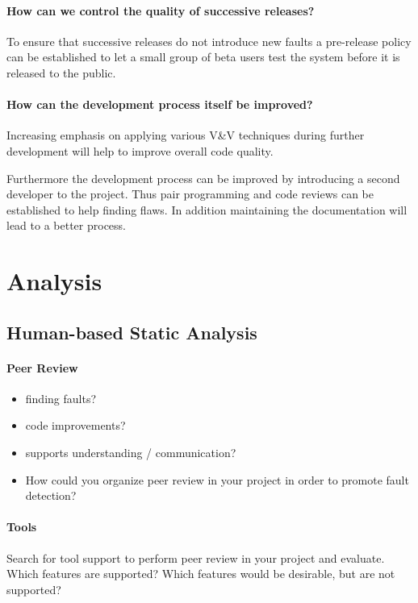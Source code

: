 \documentclass{scrartcl}
\begin{document}
\paragraph{How can we control the quality of successive releases?}

To ensure that successive releases do not introduce new faults a pre-release policy can be established to let a small group of beta users test the system before it is released to the public.

\paragraph{How can the development process itself be improved?}

Increasing emphasis on applying various V\&V techniques during further development will help to improve overall code quality. 

Furthermore the development process can be improved by introducing a second developer to the project. Thus pair programming and code reviews can be established to help finding flaws. In addition maintaining the documentation will lead to a better process.


\section{Analysis}

\subsection{Human-based Static Analysis}

\paragraph{Peer Review}
\begin{itemize}
	\item finding faults?
	\item code improvements?
	\item supports understanding / communication?
	\item How could you organize peer review in your project in order to promote fault detection?
\end{itemize}

\paragraph{Tools}
Search for tool support to perform peer review in your project and evaluate. Which features are supported? Which features would be desirable, but are not supported?
\end{document}
